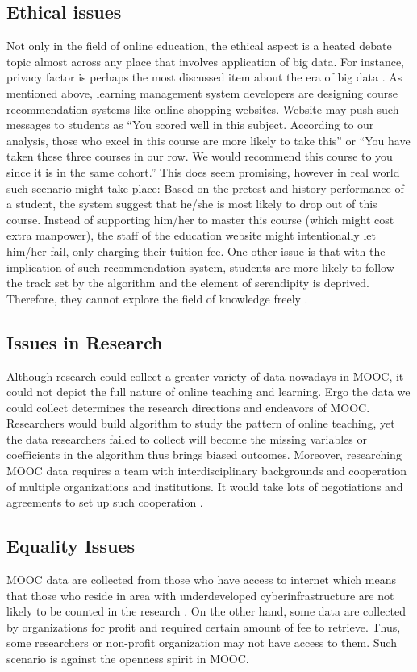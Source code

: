 \documentclass[sigconf]{acmart}
\begin{document}
\subsection{Ethical issues} 
Not only in the field of online education, the ethical aspect is a heated debate topic almost across any place that involves application of big data. For instance, privacy factor is perhaps the most discussed item about the era of big data \cite{Manyika2011}. As mentioned above, learning management system developers are designing course recommendation systems like online shopping websites. Website may push such messages to students as ``You scored well in this subject. According to our analysis, those who excel in this course are more likely to take this'' or ``You have taken these three courses in our row. We would recommend this course to you since it is in the same cohort.''
This does seem promising, however in real world such scenario might take place: Based on the pretest and history performance of a student, the system suggest that he/she is most likely to drop out of this course. Instead of supporting him/her to master this course (which might cost extra manpower), the staff of the education website might intentionally let him/her fail, only charging their tuition fee\cite{Spector2013}. One other issue is that with the implication of such recommendation system, students are more likely to follow the track set by the algorithm and the element of serendipity is deprived. Therefore, they cannot explore the field of knowledge freely \cite{Robins1989}.
\subsection{Issues in Research}
Although research could collect a greater variety of data nowadays in MOOC, it could not depict the full nature of online teaching and learning. Ergo the data we could collect determines the research directions and endeavors of MOOC. Researchers would build algorithm to study the pattern of online teaching, yet the data researchers failed to collect will become the missing variables or coefficients in the algorithm thus brings biased outcomes. Moreover, researching MOOC data requires a team with interdisciplinary backgrounds and cooperation of multiple organizations and institutions. It would take lots of negotiations and agreements to set up such cooperation \cite{Boyd2012}.
\subsection{Equality Issues}
MOOC data are collected from those who have access to internet which means that those who reside in area with underdeveloped cyberinfrastructure are not likely to be counted in the research \cite{Eynon2012}. On the other hand, some data are collected by organizations for profit and required certain amount of fee to retrieve. Thus, some researchers or non-profit organization may not have access to them. Such scenario is against the openness spirit in MOOC. 
\end{document}
